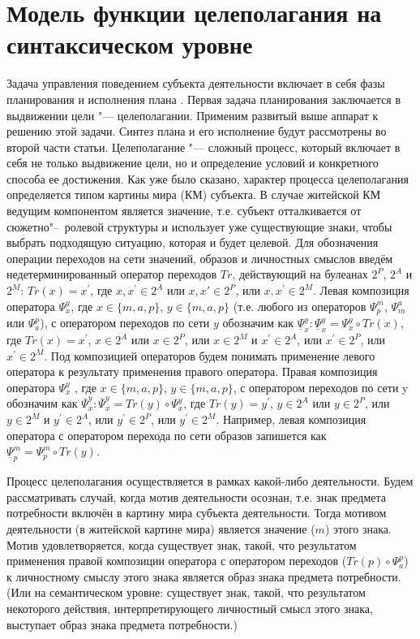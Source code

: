 \chapter{Модель функции целеполагания на синтаксическом уровне} \label{AppendixB}

Задача управления поведением субъекта деятельности включает в себя фазы планирования и исполнения плана \cite{Osipov2002c,Osipov2003a,Osipov2008b}. Первая задача планирования заключается в выдвижении цели "--- целеполагании. Применим развитый выше аппарат к решению этой задачи. Синтез плана и его исполнение будут рассмотрены во второй части статьи.
Целеполагание "--- сложный процесс, который включает в себя не только выдвижение цели, но и определение условий и конкретного способа ее достижения. Как уже было сказано, характер процесса целеполагания определяется типом картины мира (КМ) субъекта. В случае житейской КМ ведущим компонентом является значение, т.е. субъект отталкивается от сюжетно"--~ролевой структуры и использует уже существующие знаки, чтобы выбрать подходящую ситуацию, которая и будет целевой.
Для обозначения операции переходов на сети значений, образов и личностных смыслов введём недетерминированный оператор переходов $Tr$, действующий на булеанах $2^P$, $2^A$ и $2^M$: $Tr(x)=x^\prime$, где $x,x^\prime\in 2^A$ или $x,x\prime\in 2^P$, или $x,x^\prime\in 2^M$. Левая композиция оператора $\Psi_x^y$, где $x\in\{m, a, p\}$, $y\in\{m, a, p\}$ (т.е. любого из операторов  $\Psi_p^m$, $\Psi_m^a$ или $\Psi_a^p$), с оператором переходов по сети $y$ обозначим как $\underline{\Psi}_x^y:\underline{\Psi}_x^y=\Psi_x^y\circ Tr(x)$, где $Tr(x)=x^\prime$, $x\in 2^A$ или $x\in 2^P$, или $x\in 2^M$ и $x^\prime\in 2^A$, или $x^\prime\in 2^P$, или $x^\prime\in 2^M$. Под композицией операторов будем понимать применение левого оператора к результату применения правого оператора. Правая композиция оператора $\Psi_x^y$ , где $x\in\{m, a, p\}$, $y\in\{m, a, p\}$, с оператором переходов по сети y обозначим как $\overline{\Psi}_x^y: \overline{\Psi}_x^y=Tr(y)\circ\Psi_x^y$, где $Tr(y)=y^\prime$, $y\in 2^A$ или $y\in 2^P$, или $y\in 2^M$ и  $y^\prime\in 2^A$, или $y^\prime\in 2^P$, или $y^\prime\in 2^M$. Например, левая композиция оператора   с оператором перехода по сети образов запишется как $\underline{\Psi}_p^m=\Psi_p^m\circ Tr(y)$.

Процесс целеполагания осуществляется в рамках какой-либо деятельности. Будем рассматривать случай, когда мотив деятельности осознан, т.е. знак предмета потребности включён в картину мира субъекта деятельности. Тогда мотивом деятельности (в житейской картине мира) является значение ($m$) этого знака. Мотив удовлетворяется, когда существует знак, такой, что результатом применения правой композиции оператора   с оператором переходов ($Tr(p)\circ\Psi_a^p$) к личностному смыслу этого знака является образ знака предмета потребности. (Или на семантическом уровне: существует знак, такой, что результатом некоторого действия, интерпретирующего личностный смысл этого знака, выступает образ знака предмета потребности.)

